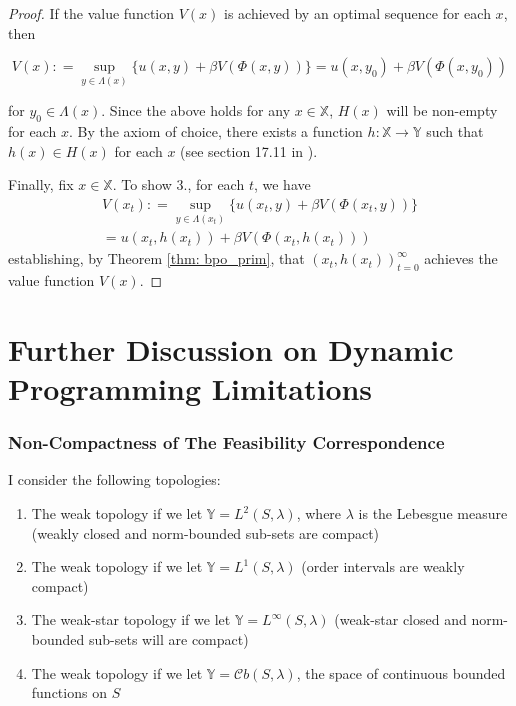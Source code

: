 \documentclass[12pt]{ectaart}
\newcommand{\1}{\mathbbm 1}
\theoremstyle{plain}
\theoremstyle{definition}
\begin{document}
\begin{proof}
	If the value function $V(x)$ is achieved by an optimal sequence for each $x$, then
	
	\begin{equation*}
	V(x) \colon = \sup_{y\in \Lambda(x)}\big\{u(x,y)+ \beta V(\Phi(x,y))\big\} = u(x,y_{0})+ \beta V(\Phi(x,y_{0}))
	\end{equation*}
	
	for $y_{0}\in \Lambda(x)$. Since the above holds for any $x\in \mathbb{X}$, $H(x)$ will be non-empty for each $x$. By the axiom of choice, there exists a function $h\colon \mathbb{X}\rightarrow \mathbb{Y}$ such that $h(x)\in H(x)$ for each $x$ (see section 17.11 in \cite{Aliprantis2005}).
	
	Finally, fix $x\in \mathbb{X}$. To show 3., for each $t$, we have
	\begin{multline*}
	V(x_{t})  \colon = \sup_{y\in \Lambda(x_{t})}\bigg\{ u(x_{t},y) + \beta V(\Phi(x_{t},y)) \bigg\} \\ = u(x_{t},h(x_{t})) + \beta V(\Phi(x_{t},h(x_{t})))
	\end{multline*}
	establishing, by Theorem \ref{thm: bpo_prim}, that $(x_{t}, h(x_{t}))_{t=0}^{\infty}$ achieves the value function  $V(x)$. 
	
\end{proof}


\section{Further Discussion on Dynamic Programming Limitations}

	\subsubsection{Non-Compactness of The Feasibility Correspondence}
	
	I  consider the following topologies:
	\begin{enumerate}
		\item The weak topology if we let $\mathbb{Y} = L^{2}(S, \lambda)$, where $\lambda$ is the Lebesgue measure (weakly closed and norm-bounded sub-sets are  compact)
		\item The weak topology if we let  $\mathbb{Y} = L^{1}(S, \lambda)$ (order intervals are weakly compact)
		\item The weak-star topology if we let $\mathbb{Y} =L^{\infty}(S, \lambda)$ (weak-star closed and norm-bounded sub-sets will are compact)
		\item The weak topology if we let $\mathbb{Y} =\mathscr{C}b(S, \lambda)$, the space of continuous bounded functions on $S$
	\end{enumerate}
	
\end{document}
